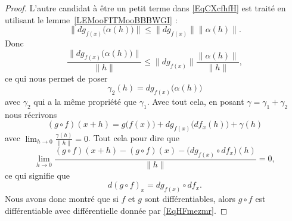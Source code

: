 \begin{proof}
	L'autre candidat à être un petit terme dans \eqref{EqCXcfhfH} est traité en utilisant le lemme~\ref{LEMooFITMooBBBWGI} :
	\begin{equation}
		\| dg_{f(x)}\big( \alpha(h) \big) \|\leq \| dg_{f(x)} \|\| \alpha(h) \|.
	\end{equation}
	Donc
	\begin{equation}
		\frac{ \| dg_{f(x)}\big( \alpha(h) \big) \| }{ \| h \| }\leq \| dg_{f(x)} \|\frac{ \| \alpha(h) \| }{ \| h \| },
	\end{equation}
	ce qui nous permet de poser
	\begin{equation}
		\gamma_2(h)=dg_{f(x)}\big( \alpha(h) \big)
	\end{equation}
	avec \( \gamma_2\) qui a la même propriété que \( \gamma_1\). Avec tout cela, en posant \( \gamma=\gamma_1+\gamma_2\) nous récrivons
	\begin{equation}
		(g\circ f)(x+h)=g\big( f(x) \big)+dg_{f(x)}\big( df_x(h) \big)+\gamma(h)
	\end{equation}
	avec \( \lim_{h\to 0} \frac{ \gamma(h) }{ \| h \| }=0\). Tout cela pour dire que
	\begin{equation}
		\lim_{h\to 0} \frac{ (g\circ f)(x+h)-(g\circ f)(x)-\big( dg_{f(x)}\circ df_x \big)(h) }{ \| h \| }=0,
	\end{equation}
	ce qui signifie que
	\begin{equation}
		d(g\circ f)_x=dg_{f(x)}\circ df_x.
	\end{equation}
	Nous avons donc montré que si \( f\) et \( g\) sont différentiables, alors \( g\circ f\) est différentiable avec différentielle donnée par \eqref{EqHFmezmr}.


\end{proof}
